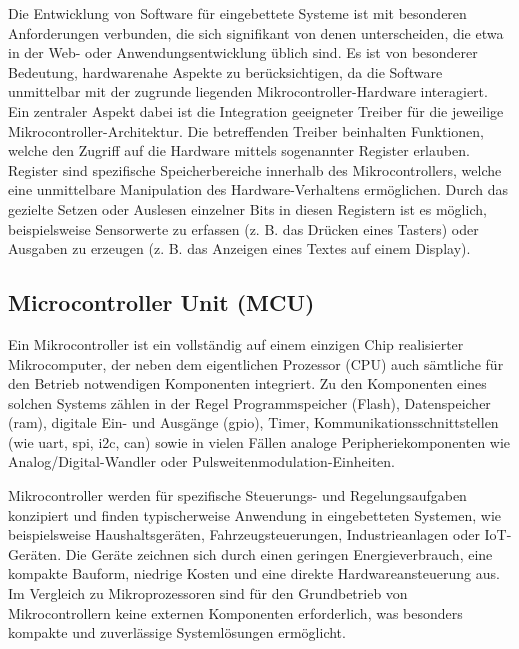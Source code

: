 %

Die Entwicklung von Software für eingebettete Systeme ist mit besonderen Anforderungen verbunden, die sich signifikant von denen unterscheiden, die etwa in der Web- oder Anwendungsentwicklung üblich sind.
Es ist von besonderer Bedeutung, hardwarenahe Aspekte zu berücksichtigen, da die Software unmittelbar mit der zugrunde liegenden Mikrocontroller-Hardware interagiert.
Ein zentraler Aspekt dabei ist die Integration geeigneter Treiber für die jeweilige Mikrocontroller-Architektur.
Die betreffenden Treiber beinhalten Funktionen, welche den Zugriff auf die Hardware mittels sogenannter Register erlauben.
Register sind spezifische Speicherbereiche innerhalb des Mikrocontrollers, welche eine unmittelbare Manipulation des Hardware-Verhaltens ermöglichen.
Durch das gezielte Setzen oder Auslesen einzelner Bits in diesen Registern ist es möglich, beispielsweise Sensorwerte zu erfassen (z. B. das Drücken eines Tasters) oder Ausgaben zu erzeugen (z. B. das Anzeigen eines Textes auf einem Display).




\subsection{Microcontroller Unit (MCU)}
Ein Mikrocontroller ist ein vollständig auf einem einzigen Chip realisierter Mikrocomputer, der neben dem eigentlichen Prozessor (CPU) auch sämtliche für den Betrieb notwendigen Komponenten integriert. 
Zu den Komponenten eines solchen Systems zählen in der Regel Programmspeicher (Flash), Datenspeicher (\gls{ram}), digitale Ein- und Ausgänge (\gls{gpio}), Timer, Kommunikationsschnittstellen (wie \gls{uart}, \gls{spi}, \gls{i2c}, \gls{can}) sowie in vielen Fällen analoge Peripheriekomponenten wie Analog/Digital-Wandler oder Pulsweitenmodulation-Einheiten.

Mikrocontroller werden für spezifische Steuerungs- und Regelungsaufgaben konzipiert und finden typischerweise Anwendung in eingebetteten Systemen, wie beispielsweise Haushaltsgeräten, Fahrzeugsteuerungen, Industrieanlagen oder IoT-Geräten. 
Die Geräte zeichnen sich durch einen geringen Energieverbrauch, eine kompakte Bauform, niedrige Kosten und eine direkte Hardwareansteuerung aus. 
Im Vergleich zu Mikroprozessoren sind für den Grundbetrieb von Mikrocontrollern keine externen Komponenten erforderlich, was besonders kompakte und zuverlässige Systemlösungen ermöglicht.


